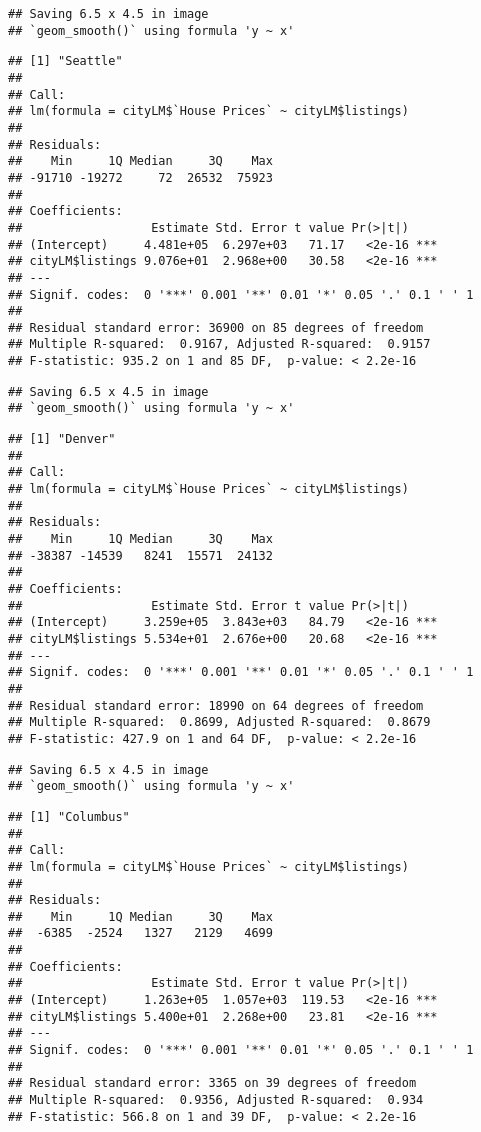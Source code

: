 \documentclass[
]{article}
\begin{document}
\begin{verbatim}
## Saving 6.5 x 4.5 in image
## `geom_smooth()` using formula 'y ~ x'
\end{verbatim}

\begin{verbatim}
## [1] "Seattle"
## 
## Call:
## lm(formula = cityLM$`House Prices` ~ cityLM$listings)
## 
## Residuals:
##    Min     1Q Median     3Q    Max 
## -91710 -19272     72  26532  75923 
## 
## Coefficients:
##                  Estimate Std. Error t value Pr(>|t|)    
## (Intercept)     4.481e+05  6.297e+03   71.17   <2e-16 ***
## cityLM$listings 9.076e+01  2.968e+00   30.58   <2e-16 ***
## ---
## Signif. codes:  0 '***' 0.001 '**' 0.01 '*' 0.05 '.' 0.1 ' ' 1
## 
## Residual standard error: 36900 on 85 degrees of freedom
## Multiple R-squared:  0.9167, Adjusted R-squared:  0.9157 
## F-statistic: 935.2 on 1 and 85 DF,  p-value: < 2.2e-16
\end{verbatim}

\begin{verbatim}
## Saving 6.5 x 4.5 in image
## `geom_smooth()` using formula 'y ~ x'
\end{verbatim}

\begin{verbatim}
## [1] "Denver"
## 
## Call:
## lm(formula = cityLM$`House Prices` ~ cityLM$listings)
## 
## Residuals:
##    Min     1Q Median     3Q    Max 
## -38387 -14539   8241  15571  24132 
## 
## Coefficients:
##                  Estimate Std. Error t value Pr(>|t|)    
## (Intercept)     3.259e+05  3.843e+03   84.79   <2e-16 ***
## cityLM$listings 5.534e+01  2.676e+00   20.68   <2e-16 ***
## ---
## Signif. codes:  0 '***' 0.001 '**' 0.01 '*' 0.05 '.' 0.1 ' ' 1
## 
## Residual standard error: 18990 on 64 degrees of freedom
## Multiple R-squared:  0.8699, Adjusted R-squared:  0.8679 
## F-statistic: 427.9 on 1 and 64 DF,  p-value: < 2.2e-16
\end{verbatim}

\begin{verbatim}
## Saving 6.5 x 4.5 in image
## `geom_smooth()` using formula 'y ~ x'
\end{verbatim}

\begin{verbatim}
## [1] "Columbus"
## 
## Call:
## lm(formula = cityLM$`House Prices` ~ cityLM$listings)
## 
## Residuals:
##    Min     1Q Median     3Q    Max 
##  -6385  -2524   1327   2129   4699 
## 
## Coefficients:
##                  Estimate Std. Error t value Pr(>|t|)    
## (Intercept)     1.263e+05  1.057e+03  119.53   <2e-16 ***
## cityLM$listings 5.400e+01  2.268e+00   23.81   <2e-16 ***
## ---
## Signif. codes:  0 '***' 0.001 '**' 0.01 '*' 0.05 '.' 0.1 ' ' 1
## 
## Residual standard error: 3365 on 39 degrees of freedom
## Multiple R-squared:  0.9356, Adjusted R-squared:  0.934 
## F-statistic: 566.8 on 1 and 39 DF,  p-value: < 2.2e-16
\end{verbatim}
\end{document}
